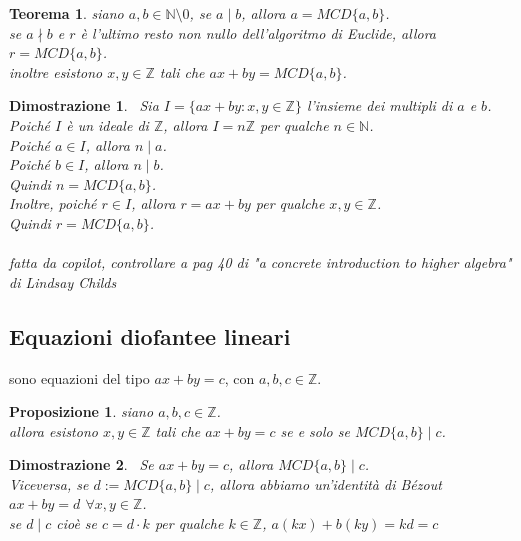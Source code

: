 \documentclass[a4paper,12pt]{article}
\theoremstyle{def}
\theoremstyle{prop}
\newtheorem*{proposition}{Proposizione}
\theoremstyle{esempio}
\theoremstyle{dimostrazione}
\newtheorem*{dimostrazione}{Dimostrazione}
\theoremstyle{teo}
\newtheorem*{teorema}{Teorema}
\theoremstyle{osservazione}
\begin{document}
\begin{teorema}
    siano \(a,b \in \mathbb{N} \setminus {0}\), se \(a \mid b\), allora \(a = MCD\{a,b\}\).\\
    se \(a \nmid b\) e \(r\) è l'ultimo resto non nullo dell'algoritmo di Euclide, allora \(r = MCD \{a,b\}\).\\
    inoltre esistono \(x,y \in \mathbb{Z} \) tali che \(ax + by = MCD \{a,b\}\).
\end{teorema}

\begin{dimostrazione}
    \
    Sia \(I = \{ax + by : x,y \in \mathbb{Z} \}\) l'insieme dei multipli di \(a\) e \(b\).\\
    Poiché \(I\) è un ideale di \(\mathbb{Z} \), allora \(I = n \mathbb{Z} \) per qualche \(n \in \mathbb{N} \).\\
    Poiché \(a \in I\), allora \(n \mid a\).\\
    Poiché \(b \in I\), allora \(n \mid b\).\\
    Quindi \(n = MCD \{a,b\}\).\\
    Inoltre, poiché \(r \in I\), allora \(r = ax + by\) per qualche \(x,y \in \mathbb{Z} \).\\
    Quindi \(r = MCD \{a,b\}\).\\
    \\
    fatta da copilot, controllare a pag 40 di "a concrete introduction to higher algebra" di Lindsay Childs
\end{dimostrazione}

\subsection{Equazioni diofantee lineari}
sono equazioni del tipo \(ax + by = c\), con \(a,b,c \in \mathbb{Z} \).\\

\begin{proposition}
    siano \(a,b,c \in \mathbb{Z} \).\\
    allora esistono \(x,y \in \mathbb{Z} \) tali che \(ax + by = c\) se e solo se \(MCD \{a,b\} \mid c\).
\end{proposition}

\begin{dimostrazione}
    \
    Se \(ax + by = c\), allora \(MCD \{a,b\} \mid c\).\\
    Viceversa, se \(d := MCD \{a,b\} \mid c\), allora abbiamo un'identità di Bézout \(ax + by = d\) \(\forall x,y \in \mathbb{Z}\).\\
    se \(d \mid c\) cioè se \(c = d \cdot k\) per qualche \(k \in \mathbb{Z} \), \(a(kx) + b(ky) = kd = c\)\\
\end{dimostrazione}
\end{document}
